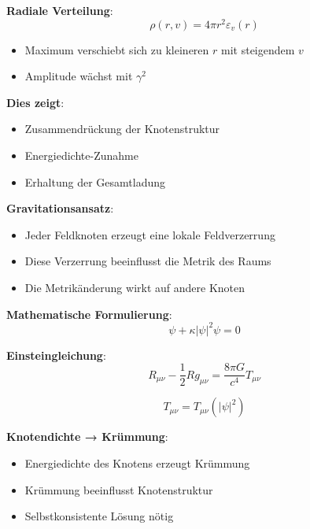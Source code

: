\documentclass[12pt,a4paper]{article}
\begin{document}
	\textbf{Radiale Verteilung}:
	\begin{equation}
		\rho(r,v) = 4\pi r^2 \varepsilon_v(r)
	\end{equation}
	
	\begin{itemize}
		\item Maximum verschiebt sich zu kleineren $r$ mit steigendem $v$
		\item Amplitude wächst mit $\gamma^2$
	\end{itemize}
	
	\textbf{Dies zeigt}:
	\begin{itemize}
		\item Zusammendrückung der Knotenstruktur
		\item Energiedichte-Zunahme
		\item Erhaltung der Gesamtladung
	\end{itemize}
	
	\textbf{Gravitationsansatz}:
	\begin{itemize}
		\item Jeder Feldknoten erzeugt eine lokale Feldverzerrung
		\item Diese Verzerrung beeinflusst die Metrik des Raums
		\item Die Metrikänderung wirkt auf andere Knoten
	\end{itemize}
	
	\textbf{Mathematische Formulierung}:
	\begin{equation}
		[g^{\mu\nu}\partial_\mu\partial_\nu + \omega_0^2]\psi + \kappa|\psi|^2\psi = 0
	\end{equation}
	
	\textbf{Einsteingleichung}:
	\begin{equation}
		R_{\mu\nu} - \frac{1}{2}Rg_{\mu\nu} = \frac{8\pi G}{c^4} T_{\mu\nu}
	\end{equation}
	
	\begin{equation}
		T_{\mu\nu} = T_{\mu\nu}(|\psi|^2)
	\end{equation}
	
	\textbf{Knotendichte → Krümmung}:
	\begin{itemize}
		\item Energiedichte des Knotens erzeugt Krümmung
		\item Krümmung beeinflusst Knotenstruktur
		\item Selbstkonsistente Lösung nötig
	\end{itemize}
	
\end{document}
